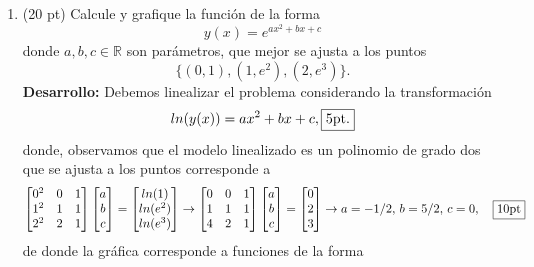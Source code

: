 \documentclass[11pt]{article}
\begin{document}
\begin{enumerate}
\begin{enumerate}
\begin{minipage}{0.4\textwidth}
    \fbox{5pt}
    \end{minipage}
\end{enumerate}

\newpage 
\item  (20 pt)
Calcule y grafique la funci\'on de la forma
$$
y(x)=e^{ax^2+bx+c}
$$
donde $a,b,c\in\mathbb{R}$ son par\'ametros, que mejor se ajusta a los puntos
$$
\{(0,1),(1,e^2),(2,e^3)\}.
$$
\textbf{Desarrollo:}
Debemos linealizar el problema considerando la transformaci\'on
$$
ln(y(x))=ax^2+bx+c, \fbox{5pt.}
$$
donde, observamos que el modelo linealizado es un polinomio de grado dos que se ajusta a los puntos corresponde a
$$
\begin{bmatrix}
0^2 & 0 & 1 \\
1^2 & 1 & 1 \\
2^2 & 2 & 1 \\
\end{bmatrix}
\begin{bmatrix}
a \\ b \\ c
\end{bmatrix}
=
\begin{bmatrix}
ln(1)\\ ln(e^{2})\\ ln(e^{3})
\end{bmatrix}
\rightarrow 
\begin{bmatrix}
0 & 0 & 1 \\
1 & 1 & 1 \\
4 & 2 & 1 \\
\end{bmatrix}
\begin{bmatrix}
a \\ b \\ c
\end{bmatrix}
=
\begin{bmatrix}
0 \\ 2 \\ 3
\end{bmatrix}
\rightarrow 
a=-1/2,\,b=5/2,\,c=0,  \quad \fbox{10pt}
$$
de donde la gr\'afica corresponde a funciones de la forma
    \begin{center}
        \end{center}



\end{enumerate}
\end{document}
